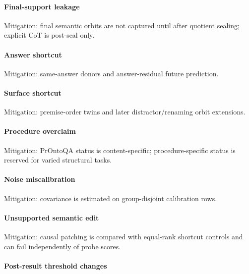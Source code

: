 \documentclass[
  10pt,
]{article}
\begin{document}
\paragraph{Final-support leakage}\label{final-support-leakage}

Mitigation: final semantic orbits are not captured until after quotient
sealing; explicit CoT is post-seal only.

\paragraph{Answer shortcut}\label{answer-shortcut}

Mitigation: same-answer donors and answer-residual future prediction.

\paragraph{Surface shortcut}\label{surface-shortcut}

Mitigation: premise-order twins and later distractor/renaming orbit
extensions.

\paragraph{Procedure overclaim}\label{procedure-overclaim}

Mitigation: PrOntoQA status is content-specific; procedure-specific
status is reserved for varied structural tasks.

\paragraph{Noise miscalibration}\label{noise-miscalibration}

Mitigation: covariance is estimated on group-disjoint calibration rows.

\paragraph{Unsupported semantic edit}\label{unsupported-semantic-edit}

Mitigation: causal patching is compared with equal-rank shortcut
controls and can fail independently of probe scores.

\paragraph{Post-result threshold
changes}\label{post-result-threshold-changes}
\end{document}
